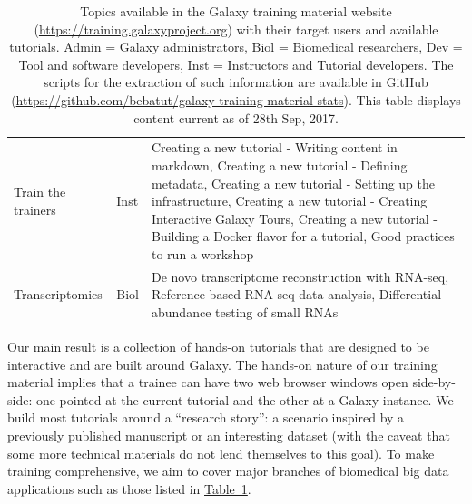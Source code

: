 \begin{table}{}
\begin{tabular}{llp{8cm}}
    Train the trainers & Inst & Creating a new tutorial - Writing content in markdown, Creating a new tutorial - Defining metadata, Creating a new tutorial - Setting up the infrastructure, Creating a new tutorial - Creating Interactive Galaxy Tours, Creating a new tutorial - Building a Docker flavor for a tutorial, Good practices to run a workshop \\

    Transcriptomics & Biol & De novo transcriptome reconstruction with RNA-seq, Reference-based RNA-seq data analysis, Differential abundance testing of small RNAs \\

    \hline
    \end{tabular}
    \caption{Topics available in the Galaxy training material website (\url{https://training.galaxyproject.org}) with their target users and available tutorials. Admin = Galaxy administrators, Biol = Biomedical researchers, Dev = Tool and software developers, Inst = Instructors and Tutorial developers. The scripts for the extraction of such information are available in GitHub (\url{https://github.com/bebatut/galaxy-training-material-stats}). This table displays content current as of 28th Sep, 2017.}
    \label{table:tutorialtable}
\end{table}

Our main result is a collection of hands-on tutorials that are designed to be interactive and are built around Galaxy. The hands-on nature of our training material implies that a trainee can have two web browser windows open side-by-side: one pointed at the current tutorial and the other at a Galaxy instance. We build most tutorials around a “research story”: a scenario inspired by a previously published manuscript or an interesting dataset (with the caveat that some more technical materials do not lend themselves to this goal). To make training comprehensive, we aim to cover major branches of biomedical big data applications such as those listed in \hyperref[table:tutorialtable]{Table~\ref*{table:tutorialtable}}.

